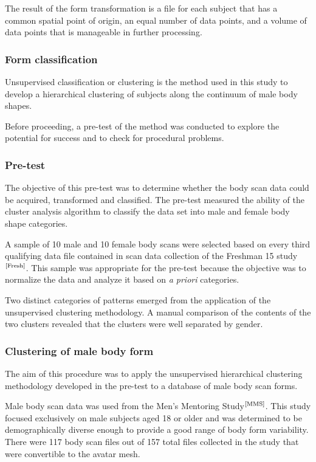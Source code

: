 \documentclass[12pt,a4paper,openany,UKenglish]{scrreprt}
\newcommand{\bib}[1]{$^\text{\cite{#1}}$}
\begin{document}
The result of the form transformation is a file for each subject that has a common spatial point of origin, an equal number of data points, and a volume of data points that is manageable in further processing.

\subsubsection{Form classification}
Unsupervised classification or clustering is the method used in this study to develop a hierarchical clustering of subjects along the continuum of male body shapes.

Before proceeding, a pre-test of the method was conducted to explore the potential for success and to check for procedural problems.

\subsubsection{Pre-test}
The objective of this pre-test was to determine whether the body scan data could be acquired, transformed and classified.
The pre-test measured the ability of the cluster analysis algorithm to classify the data set into male and female body shape categories.

A sample of 10 male and 10 female body scans were selected based on every third qualifying data file contained in scan data collection of the Freshman 15 study\bib{Fresh}.
This sample was appropriate for the pre-test because the objective was to normalize the data and analyze it based on \textit{a priori} categories.

Two distinct categories of patterns emerged from the application of the unsupervised clustering methodology. A manual comparison of the contents of the two clusters revealed that the clusters were well separated by gender.

\subsubsection{Clustering of male body form}
The aim of this procedure was to apply the unsupervised hierarchical clustering methodology developed in the pre-test to a database of male body scan forms.

Male body scan data was used from the Men’s Mentoring Study\bib{MMS}.
This study focused exclusively on male subjects aged 18 or older and was determined to be demographically diverse enough to provide a good range of body form variability.
There were 117 body scan files out of 157 total files collected in the study that were convertible to the avatar mesh.
\end{document}
